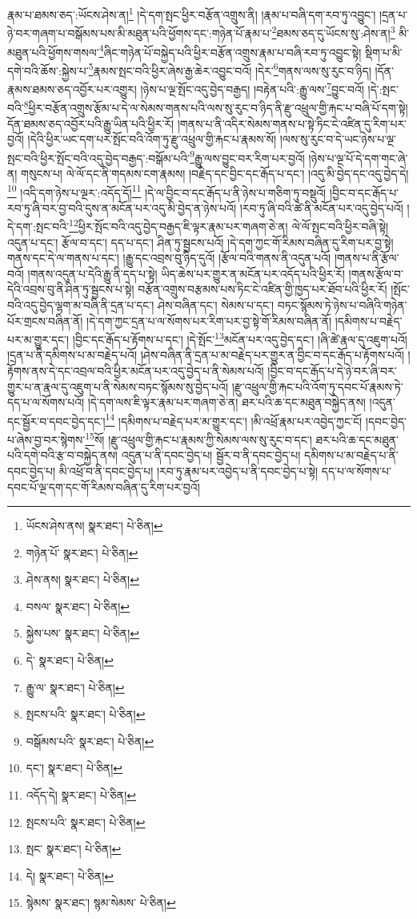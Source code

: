 རྣམ་པ་ཐམས་ཅད་:ཡོངས་ཤེས་ན།\footnote{ཡོངས་ཤེས་ནས།  སྣར་ཐང་།  པེ་ཅིན། } །དེ་དག་སྤང་ཕྱིར་བརྩོན་འགྲུས་ནི། །རྣམ་པ་བཞི་དག་རབ་ཏུ་འབྱུང་། །དྲན་པ་ཉེ་བར་གཞག་པ་བསྒོམས་པས་མི་མཐུན་པའི་ཕྱོགས་དང་:གཉེན་པོ་རྣམ་པ་\footnote{གཉེན་པོ་  སྣར་ཐང་།  པེ་ཅིན། }ཐམས་ཅད་དུ་ཡོངས་སུ་:ཤེས་ན།\footnote{ཤེས་ནས།  སྣར་ཐང་།  པེ་ཅིན། } མི་མཐུན་པའི་ཕྱོགས་གསལ་\footnote{བསལ་  སྣར་ཐང་།  པེ་ཅིན། }ཞིང་གཉེན་པོ་བསྐྱེད་པའི་ཕྱིར་བརྩོན་འགྲུས་རྣམ་པ་བཞི་རབ་ཏུ་འབྱུང་སྟེ། སྡིག་པ་མི་དགེ་བའི་ཆོས་:སྐྱེས་པ་\footnote{སྐྱེས་པས་  སྣར་ཐང་།  པེ་ཅིན། }རྣམས་སྤང་བའི་ཕྱིར་ཞེས་རྒྱ་ཆེར་འབྱུང་བའོ། །དེར་\footnote{དེ་  སྣར་ཐང་།  པེ་ཅིན། }གནས་ལས་སུ་རུང་བ་ཉིད། །དོན་རྣམས་ཐམས་ཅད་འབྱོར་པར་འགྱུར། །ཉེས་པ་ལྔ་སྤོང་འདུ་བྱེད་བརྒྱད། །བརྟེན་པའི་:རྒྱུ་ལས་\footnote{རྒྱུ་ལ་  སྣར་ཐང་།  པེ་ཅིན། }བྱུང་བའོ། །དེ་:སྤང་བའི་\footnote{སྤངས་པའི་  སྣར་ཐང་།  པེ་ཅིན། }ཕྱིར་བརྩོན་འགྲུས་རྩོམ་པ་དེ་ལ་སེམས་གནས་པའི་ལས་སུ་རུང་བ་ཉིད་ནི་རྫུ་འཕྲུལ་གྱི་རྐང་པ་བཞི་པོ་དག་སྟེ། དོན་ཐམས་ཅད་འབྱོར་པའི་རྒྱུ་ཡིན་པའི་ཕྱིར་རོ། །གནས་པ་ནི་འདིར་སེམས་གནས་པ་སྟེ་ཏིང་ངེ་འཛིན་དུ་རིག་པར་བྱའོ། །དེའི་ཕྱིར་ཡང་དག་པར་སྤོང་བའི་འོག་ཏུ་རྫུ་འཕྲུལ་གྱི་རྐང་པ་རྣམས་སོ། །ལས་སུ་རུང་བ་དེ་ཡང་ཉེས་པ་ལྔ་སྤང་བའི་ཕྱིར་སྤོང་བའི་འདུ་བྱེད་བརྒྱད་:བསྒོམ་པའི་\footnote{བསྒོམས་པའི་  སྣར་ཐང་།  པེ་ཅིན། }རྒྱུ་ལས་བྱུང་བར་རིག་པར་བྱའོ། །ཉེས་པ་ལྔ་པོ་དེ་དག་གང་ཞེ་ན། གསུངས་པ། ལེ་ལོ་དང་ནི་གདམས་ངག་རྣམས། །བརྗེད་དང་བྱིང་དང་རྒོད་པ་དང་། །འདུ་མི་བྱེད་དང་འདུ་བྱེད་དེ།\footnote{དང་།  སྣར་ཐང་།  པེ་ཅིན། } །འདི་དག་ཉེས་པ་ལྔར་:འདོད་དོ།\footnote{འདོད་དེ།  སྣར་ཐང་།  པེ་ཅིན། } །དེ་ལ་བྱིང་བ་དང་རྒོད་པ་ནི་ཉེས་པ་གཅིག་ཏུ་བསྡུའོ། །བྱིང་བ་དང་རྒོད་པ་རབ་ཏུ་ཞི་བར་བྱ་བའི་དུས་ན་མངོན་པར་འདུ་མི་བྱེད་ན་ཉེས་པའོ། །རབ་ཏུ་ཞི་བའི་ཚེ་ནི་མངོན་པར་འདུ་བྱེད་པའོ། །དེ་དག་:སྤང་བའི་\footnote{སྤངས་པའི་  སྣར་ཐང་།  པེ་ཅིན། }ཕྱིར་སྤོང་བའི་འདུ་བྱེད་བརྒྱད་ཇི་ལྟར་རྣམ་པར་གཞག་ཅེ་ན། ལེ་ལོ་སྤང་བའི་ཕྱིར་བཞི་སྟེ། འདུན་པ་དང་། རྩོལ་བ་དང་། དད་པ་དང་། ཤིན་ཏུ་སྦྱངས་པའོ། །དེ་དག་ཀྱང་གོ་རིམས་བཞིན་དུ་རིག་པར་བྱ་སྟེ། གནས་དང་དེ་ལ་གནས་པ་དང་། །རྒྱུ་དང་འབྲས་བུ་ཉིད་དུའོ། །རྩོལ་བའི་གནས་ནི་འདུན་པའོ། །གནས་པ་ནི་རྩོལ་བའོ། །གནས་འདུན་པ་དེའི་རྒྱུ་ནི་དད་པ་སྟེ། ཡིད་ཆེས་པར་གྱུར་ན་མངོན་པར་འདོད་པའི་ཕྱིར་རོ། །གནས་རྩོལ་བ་དེའི་འབྲས་བུ་ནི་ཤིན་ཏུ་སྦྱངས་པ་སྟེ། བརྩོན་འགྲུས་བརྩམས་པས་ཏིང་ངེ་འཛིན་གྱི་ཁྱད་པར་ཐོབ་པའི་ཕྱིར་རོ། །སྤོང་བའི་འདུ་བྱེད་ལྷག་མ་བཞི་ནི་དྲན་པ་དང་། ཤེས་བཞིན་དང་། སེམས་པ་དང་། བཏང་སྙོམས་ཏེ་ཉེས་པ་བཞིའི་གཉེན་པོར་གྲངས་བཞིན་ནོ། །དེ་དག་ཀྱང་དྲན་པ་ལ་སོགས་པར་རིག་པར་བྱ་སྟེ་གོ་རིམས་བཞིན་ནོ། །དམིགས་པ་བརྗེད་པར་མ་གྱུར་དང་། །བྱིང་དང་རྒོད་པ་རྟོགས་པ་དང་། །དེ་སྤོང་\footnote{སྤང་  སྣར་ཐང་།  པེ་ཅིན། }མངོན་པར་འདུ་བྱེད་དང་། །ཞི་ཚེ་རྣལ་དུ་འཇུག་པའོ། །དྲན་པ་ནི་དམིགས་པ་མ་བརྗེད་པའོ། །ཤེས་བཞིན་ནི་དྲན་པ་མ་བརྗེད་པར་གྱུར་ན་བྱིང་བ་དང་རྒོད་པ་རྟོགས་པའོ། །རྟོགས་ནས་དེ་དང་འབྲལ་བའི་ཕྱིར་མངོན་པར་འདུ་བྱེད་པ་ནི་སེམས་པའོ། །བྱིང་བ་དང་རྒོད་པ་དེ་ཉེ་བར་ཞི་བར་གྱུར་པ་ན་རྣལ་དུ་འཇུག་པ་ནི་སེམས་བཏང་སྙོམས་སུ་བྱེད་པའོ། །རྫུ་འཕྲུལ་གྱི་རྐང་པའི་འོག་ཏུ་དབང་པོ་རྣམས་ཏེ་དད་པ་ལ་སོགས་པའོ། །དེ་དག་ལས་ཇི་ལྟར་རྣམ་པར་གཞག་ཅེ་ན། ཐར་པའི་ཆ་དང་མཐུན་བསྐྱེད་ནས། །འདུན་དང་སྦྱོར་བ་དབང་བྱེད་དང་།\footnote{དེ།  སྣར་ཐང་།  པེ་ཅིན། } །དམིགས་པ་བརྗེད་པར་མ་གྱུར་དང་། །མི་འཕྲོ་རྣམ་པར་འབྱེད་ཀྱང་ངོ། །དབང་བྱེད་པ་ཞེས་བྱ་བར་སྙེགས་\footnote{སྙེམས་  སྣར་ཐང་། སྙམ་སེམས་  པེ་ཅིན། }སོ། །རྫུ་འཕྲུལ་གྱི་རྐང་པ་རྣམས་ཀྱི་སེམས་ལས་སུ་རུང་བ་དང་། ཐར་པའི་ཆ་དང་མཐུན་པའི་དགེ་བའི་རྩ་བ་བསྐྱེད་ནས། འདུན་པ་ནི་དབང་བྱེད་པ། སྦྱོར་བ་ནི་དབང་བྱེད་པ། དམིགས་པ་མ་བརྗེད་པ་ནི་དབང་བྱེད་པ། མི་འཕྲོ་བ་ནི་དབང་བྱེད་པ། །རབ་ཏུ་རྣམ་པར་འབྱེད་པ་ནི་དབང་བྱེད་པ་སྟེ། དད་པ་ལ་སོགས་པ་དབང་པོ་ལྔ་དག་དང་གོ་རིམས་བཞིན་དུ་རིག་པར་བྱའོ། 